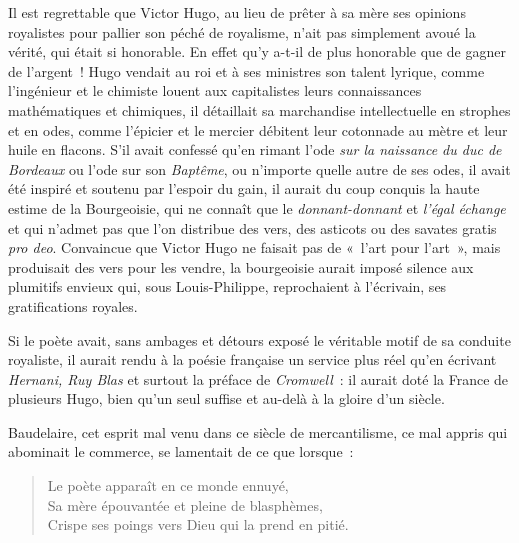 \documentclass[french,twoside]{book} %
\begin{document}
Il est regrettable que Victor Hugo, au lieu de prêter à sa mère ses opinions royalistes pour pallier son péché de royalisme, n’ait pas simplement avoué la vérité, qui était si honorable. En effet qu’y a-t-il de plus honorable que de gagner de l’argent ! Hugo vendait au roi et à ses ministres son talent lyrique, comme l’ingénieur et le chimiste louent aux capitalistes leurs connaissances mathématiques et chimiques, il détaillait sa marchandise intellectuelle en strophes et en odes, comme l’épicier et le mercier débitent leur cotonnade au mètre et leur huile en flacons. S’il avait confessé qu’en rimant l’ode {\itshape sur la naissance du duc de Bordeaux} ou l’ode sur son \emph{Baptême}, ou n’importe quelle autre de ses odes, il avait été inspiré et soutenu par l’espoir du gain, il aurait du coup conquis la haute estime  
\label{p14}de la Bourgeoisie, qui ne connaît que le {\itshape donnant-donnant} et {\itshape l’égal échange} et qui n’admet pas que l’on distribue des vers, des asticots ou des savates gratis {\itshape pro deo}. Convaincue que Victor Hugo ne faisait pas de « l’art pour l’art », mais produisait des vers pour les vendre, la bourgeoisie aurait imposé silence aux plumitifs envieux qui, sous Louis-Philippe, reprochaient à l’écrivain, ses gratifications royales.\par
Si le poète avait, sans ambages et détours exposé le véritable motif de sa conduite royaliste, il aurait rendu à la poésie française un service plus réel qu’en écrivant \emph{Hernani, Ruy Blas} et surtout la préface de \emph{Cromwell} : il aurait doté la France de plusieurs Hugo, bien qu’un seul suffise et au-delà à la gloire d’un siècle.\par
Baudelaire, cet esprit mal venu dans ce siècle de mercantilisme, ce mal appris qui abominait le commerce, se lamentait de ce que lorsque :\par


\begin{verse}
Le poète apparaît en ce monde ennuyé,\\
Sa mère épouvantée et pleine de blasphèmes,\\
Crispe ses poings vers Dieu qui la prend en pitié.\\
\end{verse}
\end{document}
